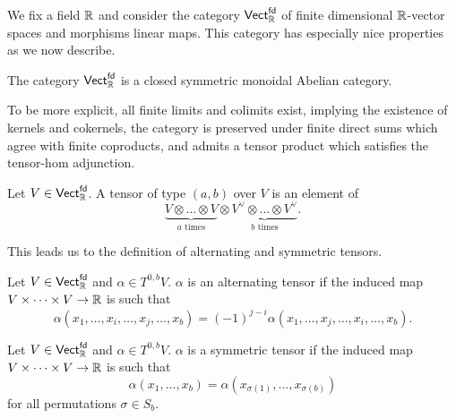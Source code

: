 We fix a field $\mathbb{R}$ and consider the category $\mathsf{Vect}^{\mathsf{fd}}_{\mathbb{R}}$ of finite dimensional $\mathbb{R}$-vector spaces and morphisms linear maps. This category has especially nice properties as we now describe. 
\begin{theorem}\label{thm: fdVect is Ab closed sym monoidal}
    The category $\mathsf{Vect}^{\mathsf{fd}}_{\mathbb{R}}$ is a closed symmetric monoidal Abelian category. 
\end{theorem}
To be more explicit, all finite limits and colimits exist, implying the existence of kernels and cokernels, the category is preserved under finite direct sums which agree with finite coproducts, and admits a tensor product which satisfies the tensor-hom adjunction. 
\begin{definition}[Tensor]\label{def: tensor}
    Let $V\in \mathsf{Vect}^{\mathsf{fd}}_{\mathbb{R}}$. A tensor of type $(a,b)$ over $V$ is an element of 
    $$\underbrace{V\otimes\dots\otimes V}_{a\text{ times}}\otimes\underbrace{V^{\vee}\otimes\dots\otimes V^{\vee}}_{b\text{ times}}.$$
\end{definition}
This leads us to the definition of alternating and symmetric tensors. 
\begin{definition}\label{def: alternating tensor}
    Let $V\in \mathsf{Vect}^{\mathsf{fd}}_{\mathbb{R}}$ and $\alpha\in T^{0,b}V$. $\alpha$ is an alternating tensor if the induced map $V\times\dots\times V\to\mathbb{R}$ is such that 
    $$\alpha(x_{1},\dots,x_{i},\dots,x_{j},\dots,x_{b})=(-1)^{j-i}\alpha(x_{1},\dots,x_{j},\dots,x_{i},\dots,x_{b}).$$
\end{definition}
\begin{definition}\label{def: symmetric tensor}
    Let $V\in \mathsf{Vect}^{\mathsf{fd}}_{\mathbb{R}}$ and $\alpha\in T^{0,b}V$. $\alpha$ is a symmetric tensor if the induced map $V\times\dots\times V\to\mathbb{R}$ is such that 
    $$\alpha(x_{1},\dots,x_{b})=\alpha(x_{\sigma(1)},\dots,x_{\sigma(b)})$$
    for all permutations $\sigma\in S_{b}$.
\end{definition}